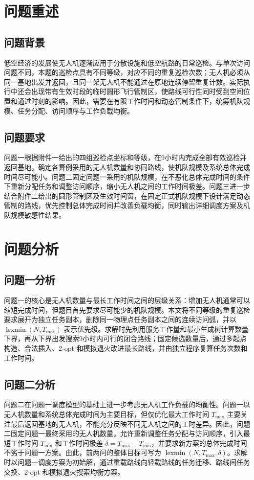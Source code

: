 \documentclass[UTF8,a4paper,12pt]{ctexart}
\numberwithin{equation}{section}
\numberwithin{equation}{section}
\begin{document}
\section{问题重述}
\subsection{问题背景}
低空经济的发展使无人机逐渐应用于分散设施和低空航路的日常巡检。与单次访问问题不同，本题的巡检点具有不同等级，对应不同的重复巡检次数；无人机必须从同一基地出发并返回，且同一架无人机不能通过在原地连续停留重复计数。实际执行中还会出现带有生效时段的临时圆形飞行管制区，使路线可行性同时受到空间位置和通过时刻的影响。因此，需要在有限工作时间和动态管制条件下，统筹机队规模、任务分配、访问顺序与工作负载均衡。

\subsection{问题要求}
问题一根据附件一给出的四组巡检点坐标和等级，在9小时内完成全部有效巡检并返回基地，确定各算例采用的无人机数量和协同路线，使机队规模及系统总体完成时间尽可能小。问题二固定问题一采用的机队规模，在不恶化总体完成时间的条件下重新分配任务和调整访问顺序，缩小无人机之间的工作时间极差。问题三进一步结合附件二给出的圆形管制区及生效时间窗，在固定正式机队规模下设计满足动态管制的路线，优先控制总体完成时间并改善负载均衡，同时输出详细调度方案及机队规模敏感性结果。

\section{问题分析}
\subsection{问题一分析}
问题一的核心是无人机数量与最长工作时间之间的层级关系：增加无人机通常可以缩短完成时间，但题目首先要求尽可能少的机队规模。本文将不同等级的重复巡检要求展开为独立任务副本，删除同一物理点任务副本之间的连续访问弧，并以 $\operatorname{lexmin}(N,T_{\max})$ 表示优先级。求解时先利用服务工作量和最小生成树计算数量下界，再从下界出发搜索9小时内可行的闭合路线；固定候选数量后，通过多起点构造、合法插入、2-opt 和模拟退火改进最长路线，并由独立程序复算任务次数和工作时间。

\subsection{问题二分析}
问题二在问题一调度模型的基础上进一步考虑无人机工作负载的均衡性。问题一以无人机数量和系统总体完成时间为主要目标，但仅优化最大工作时间 \(T_{\max}\) 主要关注最后返回基地的无人机，不能充分反映不同无人机之间的工时差异。因此，问题二固定问题一最终采用的无人机数量，允许重新调整任务分配与访问顺序，引入最短工作时间 \(T_{\min}\) 和工作时间极差
\(\delta=T_{\max}-T_{\min}\)，并要求新方案的总体完成时间不劣于问题一方案。由此，前两问的整体目标可写为
\(\operatorname{lexmin}(N,T_{\max},\delta)\)。求解时以问题一调度方案为初始解，通过重载路线向轻载路线的任务迁移、路线间任务交换、2-opt 和模拟退火搜索均衡方案。
\end{document}
